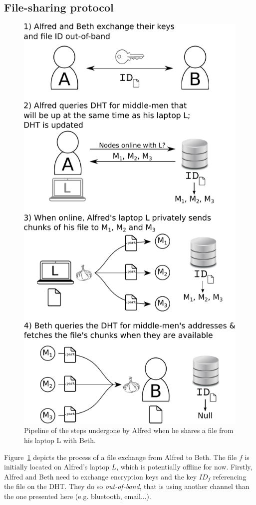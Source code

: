 \subsection{File-sharing protocol}
\label{FileSharingProtocol}

\begin{figure}[t]
\centering
\includegraphics[width=0.8\columnwidth]{figures/schema.pdf}
\caption{\label{fig:pipeline}Pipeline of the steps undergone by Alfred when he shares a file from his laptop L with Beth.}
\end{figure}

Figure~\ref{fig:pipeline} depicts the process of a file exchange from Alfred to Beth.
The file $f$ is initially located on Alfred's laptop $L$, which is potentially offline for now.
Firstly, Alfred and Beth need to exchange encryption keys and the key $ID_f$ referencing the file on the DHT.
They do so \emph{out-of-band}, that is using another channel than the one presented here (e.g. bluetooth, email...).

